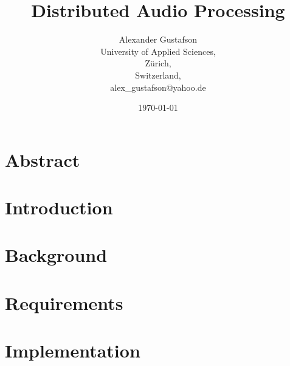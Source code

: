 \documentclass{report}
\begin{document}
\title{Distributed Audio Processing}
\author{Alexander Gustafson\\
  University of Applied Sciences,\\
  Zürich,\\
  Switzerland,\\
  alex\_gustafson@yahoo.de}
\date{\today}
\maketitle

\chapter*{Abstract}



\tableofcontents

\chapter{Introduction}



\chapter{Background}






\chapter{Requirements}







\chapter{Implementation}











\end{document}

